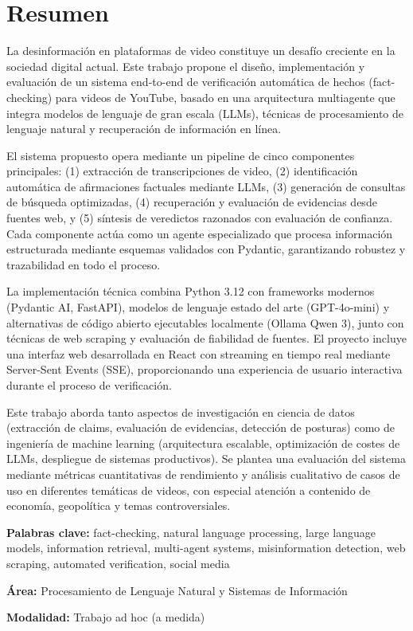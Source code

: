 \thispagestyle{empty}

\section*{Resumen}

La desinformación en plataformas de video constituye un desafío creciente en la sociedad digital actual. Este trabajo propone el diseño, implementación y evaluación de un sistema end-to-end de verificación automática de hechos (fact-checking) para videos de YouTube, basado en una arquitectura multiagente que integra modelos de lenguaje de gran escala (LLMs), técnicas de procesamiento de lenguaje natural y recuperación de información en línea.

El sistema propuesto opera mediante un pipeline de cinco componentes principales: (1) extracción de transcripciones de video, (2) identificación automática de afirmaciones factuales mediante LLMs, (3) generación de consultas de búsqueda optimizadas, (4) recuperación y evaluación de evidencias desde fuentes web, y (5) síntesis de veredictos razonados con evaluación de confianza. Cada componente actúa como un agente especializado que procesa información estructurada mediante esquemas validados con Pydantic, garantizando robustez y trazabilidad en todo el proceso.

La implementación técnica combina Python 3.12 con frameworks modernos (Pydantic AI, FastAPI), modelos de lenguaje estado del arte (GPT-4o-mini) y alternativas de código abierto ejecutables localmente (Ollama Qwen 3), junto con técnicas de web scraping y evaluación de fiabilidad de fuentes. El proyecto incluye una interfaz web desarrollada en React con streaming en tiempo real mediante Server-Sent Events (SSE), proporcionando una experiencia de usuario interactiva durante el proceso de verificación.

Este trabajo aborda tanto aspectos de investigación en ciencia de datos (extracción de claims, evaluación de evidencias, detección de posturas) como de ingeniería de machine learning (arquitectura escalable, optimización de costes de LLMs, despliegue de sistemas productivos). Se plantea una evaluación del sistema mediante métricas cuantitativas de rendimiento y análisis cualitativo de casos de uso en diferentes temáticas de videos, con especial atención a contenido de economía, geopolítica y temas controversiales.

\vspace{1cm}

\noindent\textbf{Palabras clave:} fact-checking, natural language processing, large language models, information retrieval, multi-agent systems, misinformation detection, web scraping, automated verification, social media

\vspace{0.5cm}

\noindent\textbf{Área:} Procesamiento de Lenguaje Natural y Sistemas de Información

\noindent\textbf{Modalidad:} Trabajo ad hoc (a medida)
